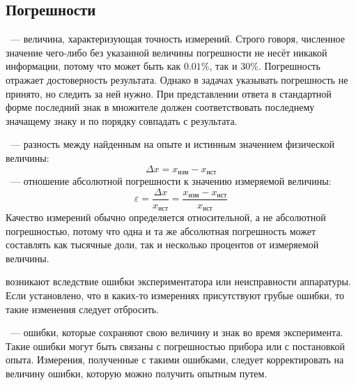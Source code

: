 \subsection{Погрешности}
~--- величина, характеризующая точность измерений. Строго говоря, численное значение чего-либо без указанной величины погрешности не несёт никакой информации, потому что  может быть как $0.01\%$, так и $30\%$. Погрешность отражает достоверность результата. Однако в задачах указывать погрешность не принято, но следить за ней нужно. При представлении ответа в стандартной форме последний знак в множителе должен соответствовать последнему значащему знаку и по порядку совпадать с  результата.

~--- разность между найденным на опыте и истинным значением физической величины:
\begin{equation}
\Delta x = x_\text{изм} - x_\text{ист}
\end{equation}
~--- отношение абсолютной погрешности к значению измеряемой величины:
\begin{equation}
\varepsilon = \frac{\Delta x}{x_\text{ист}} = \frac{x_\text{изм} - x_\text{ист}}{x_\text{ист}}
\end{equation}
Качество измерений обычно определяется относительной, а не абсолютной погрешностью, потому что одна и та же абсолютная погрешность может составлять как тысячные доли, так и несколько процентов от измеряемой величины.

 возникают вследствие ошибки экспериментатора или неисправности аппаратуры. Если установлено, что в каких-то измерениях присутствуют грубые ошибки, то такие изменения следует отбросить.

~--- ошибки, которые сохраняют свою величину и знак во время эксперимента. Такие ошибки могут быть связаны с погрешностью прибора или с постановкой опыта. Измерения, полученные с такими ошибками, следует корректировать на величину ошибки, которую можно получить опытным путем.

